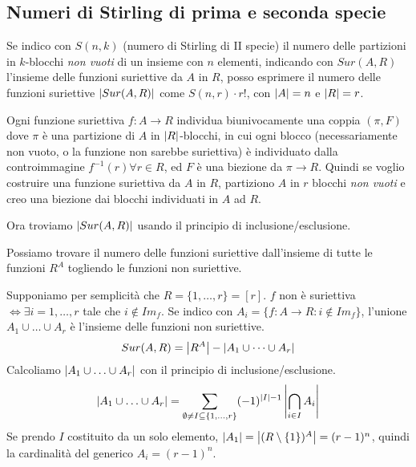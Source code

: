 \subsection{Numeri di Stirling di prima e seconda specie}




Se indico con $S(n, k)$ (numero di Stirling di II specie) il numero delle partizioni in $k$-blocchi \textit{non vuoti} di un insieme con $n$ elementi, indicando con $Sur(A, R)$ l'insieme delle funzioni suriettive da $A$ in $R$, posso esprimere il numero delle funzioni suriettive $\left\lvert{Sur(A,R)}\right\rvert $ come $S(n,r) \cdot r!$, con $\left\lvert{A}\right\rvert = n$ e $\left\lvert{R}\right\rvert = r$.

Ogni funzione suriettiva $f : A \to R $ individua biunivocamente una coppia $(\pi, F)$ dove $\pi$ \`e una partizione di $A$ in $\left\lvert{R}\right\rvert$-blocchi, in cui ogni blocco (necessariamente non vuoto, o la funzione non sarebbe suriettiva) \`e individuato dalla controimmagine $f^{-1}(r) \forall r \in R$, ed $F$ \`e una biezione da $\pi \to R$. Quindi se voglio costruire una funzione suriettiva da $A$ in $R$, partiziono $A$ in $r$ blocchi \textit{non vuoti} e creo una biezione dai blocchi individuati in $A$ ad $R$.

Ora troviamo $\left\lvert{Sur(A,R)}\right\rvert$ usando il principio di inclusione/esclusione.

Possiamo trovare il numero delle funzioni suriettive dall'insieme di tutte le funzioni $R^A$ togliendo le funzioni non suriettive.

Supponiamo per semplicit\`a che $R = \{ 1, \ldots , r\} = [r]$. $f$ non \`e suriettiva $\iff \exists i = 1, \ldots, r$ tale che $i \notin Im_f$. Se indico con $A_i = \{ f : A \to R : i \notin Im_f \}$, l'unione $A_1 \cup \ldots \cup A_r$ \`e l'insieme delle funzioni non suriettive.
\[
Sur(A,R) = \left\lvert{R^A}\right\rvert - \left\lvert{A_1 \cup \dots \cup A_r}\right\rvert
\]
Calcoliamo $\left\lvert{A_1 \cup \ldots \cup A_r}\right\rvert$ con il principio di inclusione/esclusione.
\[
\left\lvert{A_1 \cup \ldots \cup A_r}\right\rvert = 
\sum_{\emptyset \neq I \subseteq \{ 1, \ldots, r \}} (-1)^{\left\lvert{I}\right\rvert - 1} \left\lvert{\bigcap_{i \in I} A_i}\right\rvert
\]
Se prendo $I$ costituito da un solo elemento, $\left\lvert{A_1}\right\rvert = \left\lvert{(R \setminus \{ 1 \})^A}\right\rvert = (r - 1)^n$, quindi la cardinalit\`a del generico $A_i = (r-1)^n$.

